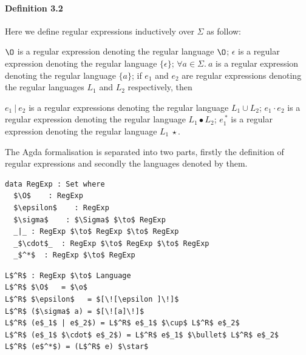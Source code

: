\documentclass[twoside,openright,final]{bhamthesis}
\renewcommand{\item}{\itemindent0.5cm\itemold}
\begin{document}
\paragraph{Definition 3.2} Here we define regular expressions
inductively over \(\Sigma\) as follow: 
\begin{enumerate}[nolistsep]
  \item \(\O\) is a regular expression denoting the regular language \(\O\);
  \item \(\epsilon\) is a regular expression denoting the regular language \(\{\epsilon\}\);
  \item \(\forall a\in\Sigma.\ a\) is a regular expression denoting the regular language \(\{a\}\);
  \item if \(e_{1}\) and \(e_{2}\) are regular expressions denoting the regular
    languages \(L_1\) and \(L_2\) respectively, then
    \begin{enumerate}[nolistsep]
      \item \(e_{1}\ |\ e_{2}\) is a regular expressions denoting the
        regular language \(L_1 \cup L_2\);
      \item \(e_{1}\cdot e_{2}\) is a regular expression denoting the
        regular language \(L_1\bullet L_2\);
      \item \(e_{1}^{\ *}\) is a regular expression denoting the regular
        language \(L_1\ \star\).
     \end{enumerate}
\end{enumerate}
\vspace{1pc}
\par The Agda formalisation is separated into two parts, firstly the
definition of regular expressions and secondly the languages denoted by
them.

\begin{lstlisting}[caption=Regular expressions,mathescape=true]
data RegExp : Set where
  $\O$    : RegExp
  $\epsilon$    : RegExp
  $\sigma$    : $\Sigma$ $\to$ RegExp
  _|_ : RegExp $\to$ RegExp $\to$ RegExp
  _$\cdot$_  : RegExp $\to$ RegExp $\to$ RegExp
  _$^*$  : RegExp $\to$ RegExp
\end{lstlisting} 

\begin{lstlisting}[caption=Languages denoted by regular expressions,mathescape=true]
L$^R$ : RegExp $\to$ Language
L$^R$ $\O$   = $\o$
L$^R$ $\epsilon$   = $[\![\epsilon ]\!]$
L$^R$ ($\sigma$ a) = $[\![a]\!]$
L$^R$ (e$_1$ | e$_2$) = L$^R$ e$_1$ $\cup$ L$^R$ e$_2$
L$^R$ (e$_1$ $\cdot$ e$_2$) = L$^R$ e$_1$ $\bullet$ L$^R$ e$_2$
L$^R$ (e$^*$) = (L$^R$ e) $\star$
\end{lstlisting}
\end{document}
